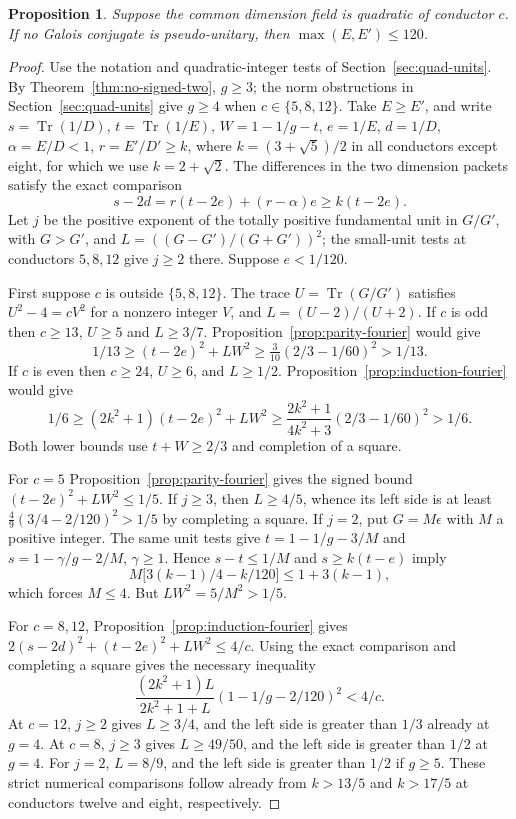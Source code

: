\documentclass[11pt,a4paper]{article}
\newtheorem{proposition}[theorem]{Proposition}
\numberwithin{equation}{section}
\begin{document}
\begin{proposition}\label{prop:quadratic-small-conductor-120}
Suppose the common dimension field is quadratic of conductor $c$.
If no Galois conjugate is pseudo-unitary, then
$\max(E,E')\le120$.
\end{proposition}
\begin{proof}
Use the notation and quadratic-integer tests of
Section~\ref{sec:quad-units}. By
Theorem~\ref{thm:no-signed-two}, $g\ge3$; the norm obstructions
in Section~\ref{sec:quad-units} give $g\ge4$ when
$c\in\{5,8,12\}$. Take $E\ge E'$, and write
$s=\operatorname{Tr}(1/D)$, $t=\operatorname{Tr}(1/E)$,
$W=1-1/g-t$, $e=1/E$, $d=1/D$, $\alpha=E/D<1$,
$r=E'/D'\ge k$, where $k=(3+\sqrt5)/2$ in all conductors
except eight, for which we use $k=2+\sqrt2$. The differences in the
two dimension packets satisfy the exact comparison
\[
       s-2d=r(t-2e)+(r-\alpha)e\ge k(t-2e).
\]
Let $j$ be the positive exponent of the totally positive fundamental
unit in $G/G'$, with $G>G'$, and
$L=((G-G')/(G+G'))^2$; the small-unit tests at conductors $5,8,12$ give $j\ge2$ there.
Suppose $e<1/120$.

First suppose $c$ is outside $\{5,8,12\}$. The trace
$U=\operatorname{Tr}(G/G')$ satisfies $U^2-4=cV^2$ for a nonzero
integer $V$, and $L=(U-2)/(U+2)$. If $c$ is odd then $c\ge13$,
$U\ge5$ and $L\ge3/7$. Proposition~\ref{prop:parity-fourier}
would give
\[
 1/13\ge(t-2e)^2+LW^2
 \ge \tfrac3{10}(2/3-1/60)^2>1/13 .
\]
If $c$ is even then $c\ge24$, $U\ge6$, and $L\ge1/2$.
Proposition~\ref{prop:induction-fourier} would give
\[
 1/6\ge (2k^2+1)(t-2e)^2+LW^2
 \ge \frac{2k^2+1}{4k^2+3}(2/3-1/60)^2>1/6.
\]
Both lower bounds use $t+W\ge2/3$ and completion of a square.

For $c=5$ Proposition~\ref{prop:parity-fourier} gives the signed bound
$(t-2e)^2+LW^2\le1/5$. If $j\ge3$, then $L\ge4/5$, whence its
left side is at least
$\frac49(3/4-2/120)^2>1/5$ by completing a square. If $j=2$,
put $G=M\epsilon$ with $M$ a positive integer. The same unit tests give
$t=1-1/g-3/M$ and $s=1-\gamma/g-2/M$, $\gamma\ge1$.
Hence $s-t\le1/M$ and $s\ge k(t-e)$ imply
\[
 M\big[3(k-1)/4-k/120\big]\le1+3(k-1),
\]
which forces $M\le4$. But $LW^2=5/M^2>1/5$.

For $c=8,12$, Proposition~\ref{prop:induction-fourier} gives
$2(s-2d)^2+(t-2e)^2+LW^2\le4/c$. Using the exact comparison and
completing a square gives the necessary inequality
\[
  \frac{(2k^2+1)L}{2k^2+1+L}
               (1-1/g-2/120)^2 < 4/c .
\]
At $c=12$, $j\ge2$ gives $L\ge3/4$, and the left side is
greater than $1/3$ already at $g=4$. At $c=8$, $j\ge3$ gives
$L\ge49/50$, and the left side is greater than $1/2$ at $g=4$.
For $j=2$, $L=8/9$, and the left side is greater than $1/2$
if $g\ge5$. These strict numerical comparisons follow already from
$k>13/5$ and $k>17/5$ at conductors twelve and eight, respectively.


\end{proof}
\end{document}
